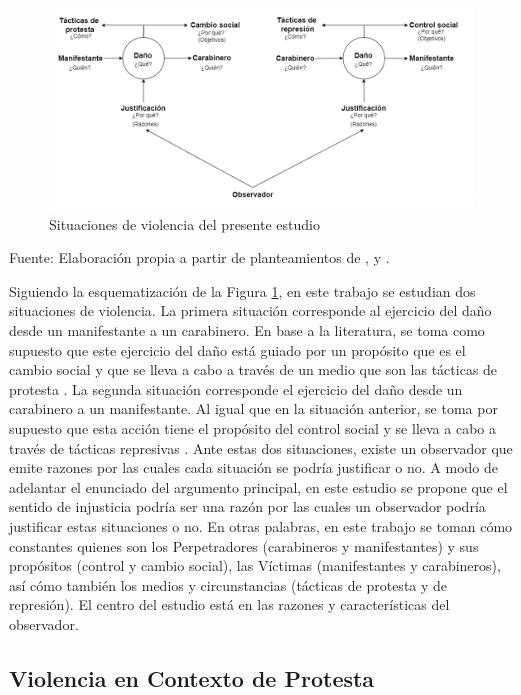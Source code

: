 \documentclass[12pt,twoside]{templates/facsothesis}
\begin{document}
\begin{figure}[!ht]
\includegraphics[width=0.75\linewidth,]{images/espmodel} \caption{Situaciones de violencia del presente estudio}\label{fig:espmodel}
\end{figure}

Fuente: Elaboración propia a partir de planteamientos de \citet{Riches1986}, \citet{Imbusch2005} y \citet{Jasso2016}.

Siguiendo la esquematización de la Figura \ref{fig:espmodel}, en este trabajo se estudian dos situaciones de violencia. La primera situación corresponde al ejercicio del daño desde un manifestante a un carabinero. En base a la literatura, se toma como supuesto que este ejercicio del daño está guiado por un propósito que es el cambio social y que se lleva a cabo a través de un medio que son las tácticas de protesta \citep{Blumenthal1972, Gerber2016}. La segunda situación corresponde el ejercicio del daño desde un carabinero a un manifestante. Al igual que en la situación anterior, se toma por supuesto que esta acción tiene el propósito del control social y se lleva a cabo a través de tácticas represivas \citep{Blumenthal1972, Gerber2016}. Ante estas dos situaciones, existe un observador que emite razones por las cuales cada situación se podría justificar o no. A modo de adelantar el enunciado del argumento principal, en este estudio se propone que el sentido de injusticia podría ser una razón por las cuales un observador podría justificar estas situaciones o no. En otras palabras, en este trabajo se toman cómo constantes quienes son los Perpetradores (carabineros y manifestantes) y sus propósitos (control y cambio social), las Víctimas (manifestantes y carabineros), así cómo también los medios y circunstancias (tácticas de protesta y de represión). El centro del estudio está en las razones y características del observador.

\hypertarget{violencia-en-contexto-de-protesta}{%
\subsection{Violencia en Contexto de Protesta}\label{violencia-en-contexto-de-protesta}}
\end{document}
